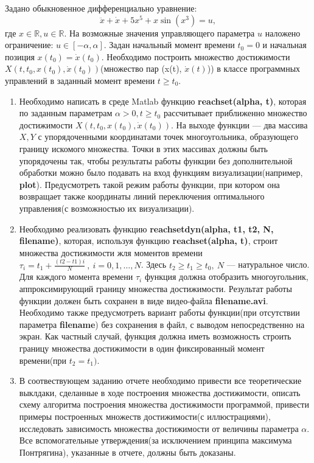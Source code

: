 \documentclass[11pt]{article}
\begin{document}
 Задано обыкновенное дифференциально уравнение:
\[ \ddot{x} + \dot{x} + 5x^5 + x \sin(x^3) = u, \]
где \( x \in \mathbb{R}, u \in \mathbb{R} \). На возможные значения управляющего параметра \( u \) наложено ограничение: \( u \in [-\alpha, \alpha] \). Задан начальный момент времени \( t_0 = 0 \) и начальная позиция \( x(t_0) = \dot{x}(t_0) \). Необходимо построить множество достижимости \( X(t, t_0,   x(t_0), \dot{x}(t_0)) \)(множество пар (x(t), \( \dot{x}(t) \))) в классе программных управлений в заданный момент времени \( t \ge t_0 \).
\begin{enumerate}
	\item Необходимо написать в среде Matlab функцию \textbf{reachset(alpha, t)}, которая по заданным параметрам \( \alpha > 0, t \ge t_0 \) рассчитывает приближенно множество достижимости \( X(t, t_0, x(t_0), \dot{x}(t_0)) \). На выходе функции --- два массива \( X, Y \) с упорядоченными координатами точек многоугольника, образующего границу искомого множества. Точки в этих массивах должны быть упорядочены так, чтобы результаты работы функции без дополнительной обработки можно было подавать на вход функциям визуализации(например, \textbf{plot}). Предусмотреть такой режим работы функции, при котором она возвращает также координаты линий переключения оптимального управления(с возможностью их визуализации).
	\item Необходимо реализовать функцию \textbf{reachsetdyn(alpha, t1, t2, N, filename)}, которая, используя функцию \textbf{reachset(alpha, t)}, строит множества достижимости жля моментов времени \( \tau_i = t_1 + \frac{(t2-t1)i}{N} \ , \ i = 0,1,\dots,N\). Здесь \( t_2 \ge t_1 \ge t_0, \ N \) --- натуральное число. Для каждого момента времени \( \tau_i \) функция должна отобразить многоугольник, аппроксимирующий границу множества достижимости. Результат работы функции должен быть сохранен в виде видео-файла \textbf{filename.avi}. Необходимо также предусмотреть вариант работы функции(при отсутствии параметра \textbf{filename}) без сохранения в файл, с выводом непосредственно на экран. Как частный случай, функция должна иметь возможность строить границу множества достижимости в один фиксированный момент времени(при \( t_2 = t_1). \)
	\item В соотвествующем заданию отчете необходимо привести все теоретические выклдаки, сделанные в ходе построения множества достижимости, описать схему алгоритма построения множества достижимости программой, привести примеры построенных множеств достижимости(с иллюстрациями), исследовать зависимость множества достижимости от величины параметра \( \alpha \). Все вспомогательные утверждения(за исключением принципа максимума Понтрягина), указанные в отчете, должны быть доказаны.
\end{enumerate}
\end{document}
